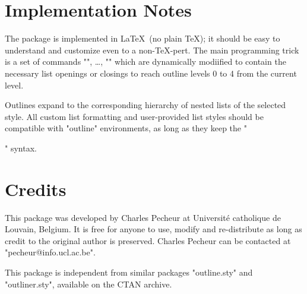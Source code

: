 \documentclass[11pt]{article}
\begin{document}
\section{Implementation Notes}

The package is implemented in \LaTeX\ (no plain \TeX); it should be
easy to understand and customize even to a non-\TeX-pert.  The main
programming trick is a set of commands "\ol@toz", \dots, "\ol@toiiii"
which are dynamically modiified to contain the necessary list openings or closings to reach outline levels 0 to 4 from the current level.

Outlines expand to the corresponding hierarchy of nested lists of the
selected style.  All custom list formatting and user-provided list styles
should be compatible with "outline" environments, as long as they keep
the "\item" syntax.

\section{Credits}

This package was developed by Charles Pecheur at Universit\'e catholique de
Louvain, Belgium.  It is free for anyone to use, modify and re-distribute
as long as credit to the original author is preserved.  Charles Pecheur
can be contacted at "pecheur@info.ucl.ac.be".

This package is independent from similar packages "outline.sty" and "outliner.sty", available on the CTAN archive.
\end{document}
